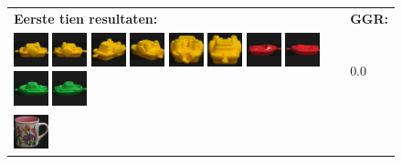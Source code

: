 \begin{figure}[!bp]
\vspace{5pt}
\centering
\begin{tabular}{m{11cm} | m{3cm} |}
\textbf{Eerste tien resultaten:} & \textbf{GGR:} \\
\vspace{4pt}
\includegraphics[width=1cm]{coil/beeld-12.eps}
\includegraphics[width=1cm]{coil/beeld-13.eps}
\includegraphics[width=1cm]{coil/beeld-15.eps}
\includegraphics[width=1cm]{coil/beeld-16.eps}
\includegraphics[width=1cm]{coil/beeld-17.eps}
\includegraphics[width=1cm]{coil/beeld-14.eps}
\includegraphics[width=1cm]{coil/beeld-19.eps}
\includegraphics[width=1cm]{coil/beeld-18.eps}
\includegraphics[width=1cm]{coil/beeld-54.eps}
\includegraphics[width=1cm]{coil/beeld-55.eps}
& {\scriptsize 0.0}
\\
\includegraphics[width=1cm]{coil/beeld-6.eps}

\end{tabular}
\end{figure}
